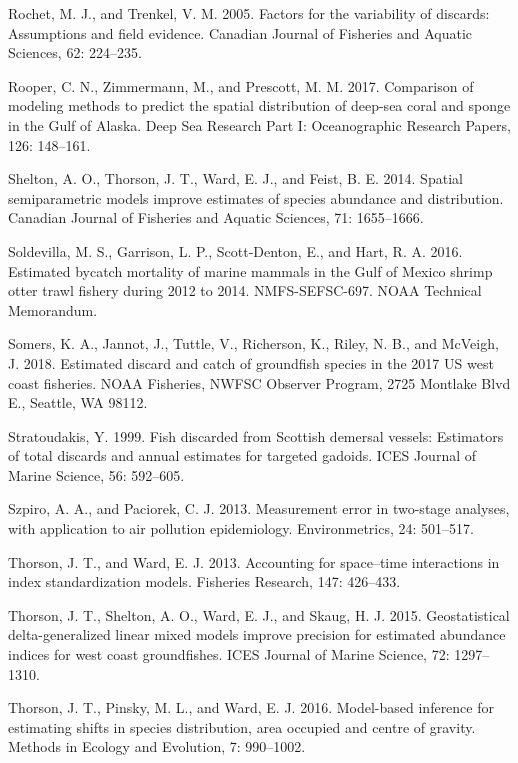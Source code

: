 \documentclass[]{article}
\begin{document}
\hypertarget{ref-rochet2005}{}
Rochet, M. J., and Trenkel, V. M. 2005. Factors for the variability of
discards: Assumptions and field evidence. Canadian Journal of Fisheries
and Aquatic Sciences, 62: 224--235.

\hypertarget{ref-rooper2017}{}
Rooper, C. N., Zimmermann, M., and Prescott, M. M. 2017. Comparison of
modeling methods to predict the spatial distribution of deep-sea coral
and sponge in the Gulf of Alaska. Deep Sea Research Part I:
Oceanographic Research Papers, 126: 148--161.

\hypertarget{ref-shelton2014}{}
Shelton, A. O., Thorson, J. T., Ward, E. J., and Feist, B. E. 2014.
Spatial semiparametric models improve estimates of species abundance and
distribution. Canadian Journal of Fisheries and Aquatic Sciences, 71:
1655--1666.

\hypertarget{ref-soldevilla2016}{}
Soldevilla, M. S., Garrison, L. P., Scott-Denton, E., and Hart, R. A.
2016. Estimated bycatch mortality of marine mammals in the Gulf of
Mexico shrimp otter trawl fishery during 2012 to 2014. NMFS-SEFSC-697.
NOAA Technical Memorandum.

\hypertarget{ref-somers2018}{}
Somers, K. A., Jannot, J., Tuttle, V., Richerson, K., Riley, N. B., and
McVeigh, J. 2018. Estimated discard and catch of groundfish species in
the 2017 US west coast fisheries. NOAA Fisheries, NWFSC Observer
Program, 2725 Montlake Blvd E., Seattle, WA 98112.

\hypertarget{ref-stratoudakis1999}{}
Stratoudakis, Y. 1999. Fish discarded from Scottish demersal vessels:
Estimators of total discards and annual estimates for targeted gadoids.
ICES Journal of Marine Science, 56: 592--605.

\hypertarget{ref-szpiro2013}{}
Szpiro, A. A., and Paciorek, C. J. 2013. Measurement error in two-stage
analyses, with application to air pollution epidemiology.
Environmetrics, 24: 501--517.

\hypertarget{ref-thorson2013}{}
Thorson, J. T., and Ward, E. J. 2013. Accounting for space--time
interactions in index standardization models. Fisheries Research, 147:
426--433.

\hypertarget{ref-thorson2015}{}
Thorson, J. T., Shelton, A. O., Ward, E. J., and Skaug, H. J. 2015.
Geostatistical delta-generalized linear mixed models improve precision
for estimated abundance indices for west coast groundfishes. ICES
Journal of Marine Science, 72: 1297--1310.

\hypertarget{ref-thorson2016}{}
Thorson, J. T., Pinsky, M. L., and Ward, E. J. 2016. Model-based
inference for estimating shifts in species distribution, area occupied
and centre of gravity. Methods in Ecology and Evolution, 7: 990--1002.
\end{document}
